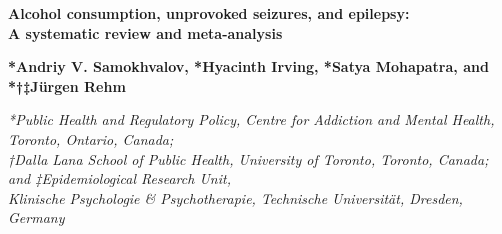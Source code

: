 \documentclass{article}
\begin{document}
\setlength{\headheight}{23.10004pt}
\begin{center}
\end{center}

\begin{center}
  \textbf{\LARGE Alcohol consumption, unprovoked seizures, and epilepsy:}\\
  \textbf{\LARGE A systematic review and meta-analysis}
\end{center}

\begin{center}
  \textbf{*Andriy V. Samokhvalov, *Hyacinth Irving, *Satya Mohapatra, and *†‡Jürgen Rehm}
\end{center}

\begin{center}
  \textit{*Public Health and Regulatory Policy, Centre for Addiction and Mental Health, Toronto, Ontario, Canada;}\\
  \textit{†Dalla Lana School of Public Health, University of Toronto, Toronto, Canada; and ‡Epidemiological Research Unit,}\\
  \textit{Klinische Psychologie \& Psychotherapie, Technische Universität, Dresden, Germany}
\end{center}

\end{document}
